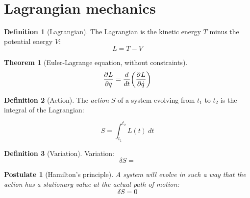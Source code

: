 \documentclass[]{article}
\newtheorem{theorem}{Theorem}
\newtheorem{postulate}{Postulate}
\theoremstyle{definition}
\newtheorem{definition}{Definition}
\begin{document}
\section{Lagrangian mechanics}

\begin{definition}[Lagrangian]
	The Lagrangian is the kinetic energy $T$ minus the potential energy $V$:
\begin{equation*}
	L = T - V
\end{equation*}
\end{definition}

\begin{theorem}
	[Euler-Lagrange equation, without constraints]
	\begin{equation*}
		\frac{\partial^{} L}{\partial q ^{}} = \frac{d}{dt}\qty(\frac{\partial^{} L}{\partial \dot q ^{}})
	\end{equation*}
\end{theorem}

\begin{definition}[Action]
	The \emph{action} $S$ of a system evolving from $t_1$ to $t_2$ is the integral of the Lagrangian:
\end{definition}

\begin{equation*}
	S = \int_{t_1}^{t_2} L(t) \ dt
\end{equation*}

\begin{definition}[Variation]
	Variation:
	\begin{equation*}
		\delta S = 
	\end{equation*}
\end{definition}

\begin{postulate}[Hamilton's principle]
	A system will evolve in such a way that the action has a stationary value at the actual path of motion:
\begin{equation*}
	\delta S = 0
\end{equation*}
\end{postulate}
\end{document}
